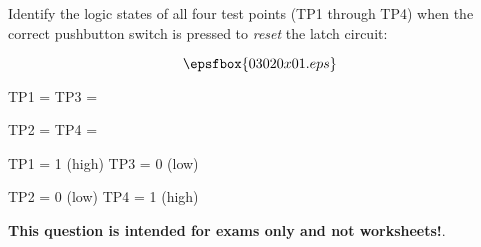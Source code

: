 

Identify the logic states of all four test points (TP1 through TP4) when the correct pushbutton switch is pressed to {\it reset} the latch circuit:

$$\epsfbox{03020x01.eps}$$

TP1 = \hskip 100pt TP3 = 

\vskip 10pt

TP2 = \hskip 100pt TP4 = 







TP1 = 1 (high) \hskip 100pt TP3 = 0 (low)

\vskip 10pt

TP2 = 0 (low) \hskip 100pt TP4 = 1 (high)







{\bf This question is intended for exams only and not worksheets!}.




